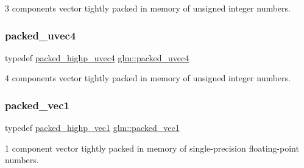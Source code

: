 3 components vector tightly packed in memory of unsigned integer numbers. 

\mbox{\label{group__gtc__type__aligned_ga32a9f8facf5745a6513186ce61122310}} 
\subsubsection{\texorpdfstring{packed\+\_\+uvec4}{packed\_uvec4}}
{\footnotesize\ttfamily typedef \mbox{\hyperlink{group__gtc__type__aligned_ga769bab317264c023f8ee77897e4b5894}{packed\+\_\+highp\+\_\+uvec4}} \mbox{\hyperlink{group__gtc__type__aligned_ga32a9f8facf5745a6513186ce61122310}{glm\+::packed\+\_\+uvec4}}}



4 components vector tightly packed in memory of unsigned integer numbers. 

\mbox{\label{group__gtc__type__aligned_ga1722068e0357aca709e5002f20cc043f}} 
\subsubsection{\texorpdfstring{packed\+\_\+vec1}{packed\_vec1}}
{\footnotesize\ttfamily typedef \mbox{\hyperlink{group__gtc__type__aligned_ga0356e10a8b10f699cf7cf4308f449c83}{packed\+\_\+highp\+\_\+vec1}} \mbox{\hyperlink{group__gtc__type__aligned_ga1722068e0357aca709e5002f20cc043f}{glm\+::packed\+\_\+vec1}}}



1 component vector tightly packed in memory of single-\/precision floating-\/point numbers. 

\mbox{\label{group__gtc__type__aligned_ga702841b8b37825c9a51d95bc0f7848b2}} 
